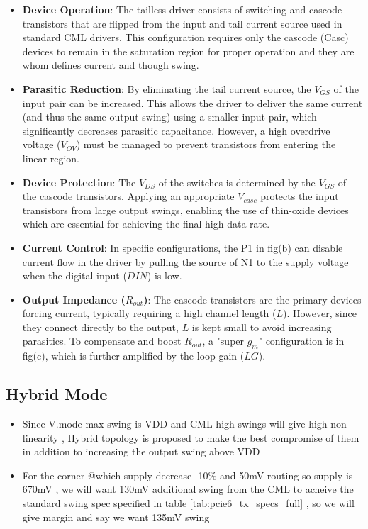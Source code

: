 \begin{itemize}
    \item \textbf{Device Operation}: The tailless driver consists of switching and cascode transistors that are flipped from the input and tail current source used in standard CML drivers. This configuration requires only the cascode (Casc) devices to remain in the saturation region for proper operation and they are whom defines current and though swing.
    
    \item \textbf{Parasitic Reduction}: By eliminating the tail current source, the $V_{GS}$ of the input pair can be increased. This allows the driver to deliver the same current (and thus the same output swing) using a smaller input pair, which significantly decreases parasitic capacitance. However, a high overdrive voltage ($V_{OV}$) must be managed to prevent transistors from entering the linear region.
    
    \item \textbf{Device Protection}: The $V_{DS}$ of the switches is determined by the $V_{GS}$ of the cascode transistors. Applying an appropriate $V_{casc}$ protects the input transistors from large output swings, enabling the use of thin-oxide devices which are essential for achieving the final high data rate.
    
    \item \textbf{Current Control}: In specific configurations, the P1 in fig(b) can disable current flow in the driver by pulling the source of N1 to the supply voltage when the digital input ($DIN$) is low.
    
    \item \textbf{Output Impedance ($R_{out}$)}: The cascode transistors are the primary devices forcing current, typically requiring a high channel length ($L$). However, since they connect directly to the output, $L$ is kept small to avoid increasing parasitics. To compensate and boost $R_{out}$, a "super $g_m$" configuration is  in fig(c), which is further amplified by the loop gain ($LG$).
\end{itemize}

\subsection{Hybrid Mode} \label{subsec:Hybrid_mode}
\begin{itemize}
    \item Since V.mode max swing is VDD and CML high swings will give high non linearity , Hybrid topology is proposed to make the best compromise of them in addition to increasing the output swing above VDD
    \item For the corner @which supply decrease -10\% and 50mV routing so supply is 670mV , we will want 130mV additional swing from the CML to acheive the standard swing spec specified in table \ref{tab:pcie6_tx_specs_full} , so we will give margin and say we want 135mV swing
\end{itemize}

